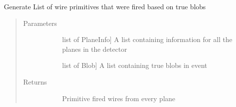 \documentclass[letterpaper,10pt,english]{sphinxmanual}
\begin{document}

\begin{fulllineitems}
\label{\detokenize{geometryGen:geometryGen.generateEvent}}
Generate List of wire primitives that were fired based on true blobs
\begin{quote}\begin{description}
\item[{Parameters}] \leavevmode\begin{description}
\item[{}] \leavevmode{[}list of PlaneInfo{]}
A list containing information for all the planes in the detector

\item[{}] \leavevmode{[}list of Blob{]}
A list containing true blobs in event

\end{description}

\item[{Returns}] \leavevmode\begin{description}
\item[{}] \leavevmode
Primitive fired wires from every plane

\end{description}

\end{description}\end{quote}

\end{fulllineitems}

\end{document}
